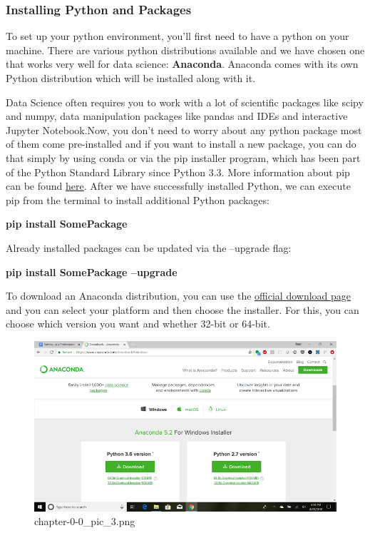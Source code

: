 \documentclass[11pt]{article}
\begin{document}
    \hypertarget{installing-python-and-packages}{%
\subsubsection{Installing Python and
Packages}\label{installing-python-and-packages}}

    To set up your python environment, you'll first need to have a python on
your machine. There are various python distributions available and we
have chosen one that works very well for data science:
\textbf{Anaconda}. Anaconda comes with its own Python distribution which
will be installed along with it.

Data Science often requires you to work with a lot of scientific
packages like scipy and numpy, data manipulation packages like pandas
and IDEs and interactive Jupyter Notebook.Now, you don't need to worry
about any python package most of them come pre-installed and if you want
to install a new package, you can do that simply by using conda or via
the pip installer program, which has been part of the Python Standard
Library since Python 3.3. More information about pip can be found
\href{https://docs.python.org/3/installing/index.html}{here}. After we
have successfully installed Python, we can execute pip from the terminal
to install additional Python packages:

\textbf{pip install SomePackage}

Already installed packages can be updated via the --upgrade flag:

\textbf{pip install SomePackage --upgrade}

To download an Anaconda distribution, you can use the
\href{https://www.anaconda.com/download/}{official download page} and
you can select your platform and then choose the installer. For this,
you can choose which version you want and whether 32-bit or 64-bit.

    \begin{figure}
\centering
\includegraphics{./pic/chapter-0-0_pic_3.png}
\caption{chapter-0-0\_pic\_3.png}
\end{figure}
\end{document}
